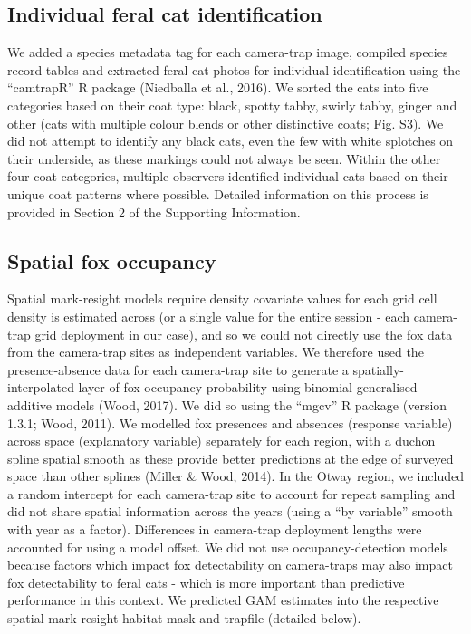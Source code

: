 \documentclass[]{elsarticle} %
\begin{document}
\hypertarget{individual-feral-cat-identification}{%
\subsection{Individual feral cat identification}\label{individual-feral-cat-identification}}

We added a species metadata tag for each camera-trap image, compiled species record tables and extracted feral cat photos for individual identification using the ``camtrapR'' R package (Niedballa et al., 2016). We sorted the cats into five categories based on their coat type: black, spotty tabby, swirly tabby, ginger and other (cats with multiple colour blends or other distinctive coats; Fig. S3). We did not attempt to identify any black cats, even the few with white splotches on their underside, as these markings could not always be seen. Within the other four coat categories, multiple observers identified individual cats based on their unique coat patterns where possible. Detailed information on this process is provided in Section 2 of the Supporting Information.

\hypertarget{spatial-fox-occupancy}{%
\subsection{Spatial fox occupancy}\label{spatial-fox-occupancy}}

Spatial mark-resight models require density covariate values for each grid cell density is estimated across (or a single value for the entire session - each camera-trap grid deployment in our case), and so we could not directly use the fox data from the camera-trap sites as independent variables. We therefore used the presence-absence data for each camera-trap site to generate a spatially-interpolated layer of fox occupancy probability using binomial generalised additive models (Wood, 2017). We did so using the ``mgcv'' R package (version 1.3.1; Wood, 2011). We modelled fox presences and absences (response variable) across space (explanatory variable) separately for each region, with a duchon spline spatial smooth as these provide better predictions at the edge of surveyed space than other splines (Miller \& Wood, 2014). In the Otway region, we included a random intercept for each camera-trap site to account for repeat sampling and did not share spatial information across the years (using a ``by variable'' smooth with year as a factor). Differences in camera-trap deployment lengths were accounted for using a model offset. We did not use occupancy-detection models because factors which impact fox detectability on camera-traps may also impact fox detectability to feral cats - which is more important than predictive performance in this context. We predicted GAM estimates into the respective spatial mark-resight habitat mask and trapfile (detailed below).
\end{document}
